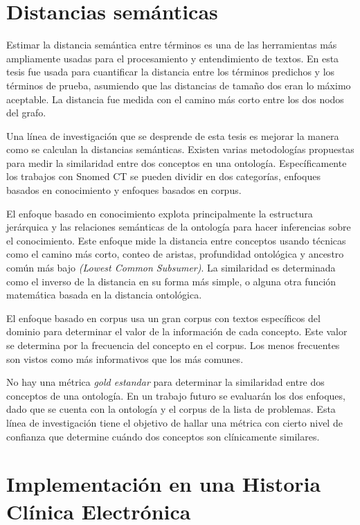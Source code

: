 \section{Distancias semánticas}

Estimar la distancia semántica entre términos es una de las herramientas más ampliamente usadas para el procesamiento y entendimiento de textos. En esta tesis fue usada para cuantificar la distancia entre los términos predichos y los términos de prueba, asumiendo que las distancias de tamaño dos eran lo máximo aceptable. La distancia fue medida con el camino más corto entre los dos nodos del grafo.

Una línea de investigación que se desprende de esta tesis es mejorar la manera como se calculan la distancias semánticas. Existen varias metodologías propuestas para medir la similaridad entre dos conceptos en una ontología. Específicamente los trabajos con Snomed CT se pueden dividir en dos categorías, enfoques basados en conocimiento y enfoques basados en corpus.  \cite{Mabotuwana2013,BenAouicha2016,Sanchez2011,Harispe2014}

El enfoque basado en conocimiento explota principalmente la estructura jerárquica y las relaciones semánticas de la ontología para hacer inferencias sobre el conocimiento. Este enfoque mide la distancia entre conceptos usando técnicas como el camino más corto, conteo de aristas, profundidad ontológica y ancestro común más bajo \textit{(Lowest Common Subsumer)}. La similaridad es determinada como el inverso de la distancia en su forma más simple, o alguna otra función matemática basada en la distancia ontológica.\cite{Mabotuwana2013}

El enfoque basado en corpus usa un gran corpus con textos específicos del dominio para determinar el valor de la información de cada concepto. Este valor se determina por la frecuencia del concepto en el corpus. Los menos frecuentes son vistos como más informativos que los más comunes.\cite{Mabotuwana2013}

No hay una métrica \textit{gold estandar} para determinar la similaridad entre dos conceptos de una ontología. En un trabajo futuro se evaluarán los dos enfoques, dado que se cuenta con la ontología y el corpus de la lista de problemas. Esta línea de investigación tiene  el objetivo de hallar una métrica con cierto nivel de confianza que determine cuándo dos conceptos son clínicamente similares.

\section{Implementación en una Historia Clínica Electrónica}

